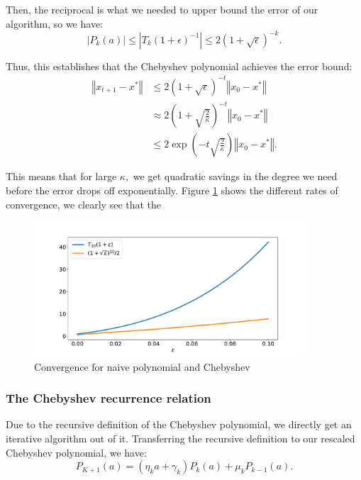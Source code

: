 Then, the reciprocal is what we needed to upper bound the error of our algorithm, so we have:
\begin{equation*}
|P_k(a)| \leq {|T_k(1 + \epsilon)^{-1}|} \leq 2(1 + \sqrt{\epsilon})^{-k}.
\end{equation*}

Thus, this establishes that the Chebyshev polynomial achieves the error bound:
\begin{align*}
\left\Vert x_{t+1} - x^* \right\Vert &\leq 2(1 + \sqrt{\epsilon})^{-t}
\left\Vert x_0 -x^*\right\Vert \\
&\approx 2\left(1 + \sqrt{\frac{2}{\kappa}}\right)^{-t} \left\Vert x_0 -x^*\right\Vert \\
&\leq 2\exp\left(-t \sqrt{\frac{2}{\kappa}}\right) \left\Vert x_0 -x^*\right\Vert.
\end{align*}

This means that for large $\kappa,$ we get quadratic savings in the degree we need before the error drops off exponentially. Figure \ref{convergence} shows the different rates of convergence, we clearly see that the 

\begin{figure}[ht]
\includegraphics[width=0.9\textwidth]{figures/lecture6-conv.pdf}
\centering
\caption{Convergence for naive polynomial and Chebyshev}
\label{convergence}
\end{figure}

\subsubsection{The Chebyshev recurrence relation}
Due to the recursive definition of the Chebyshev polynomial, we directly get an iterative algorithm out of it. Transferring the recursive definition to our rescaled Chebyshev polynomial, we have:
\begin{equation*}
P_{K+1}(a) = (\eta_k a + \gamma_k)P_k(a) + \mu_k P_{k-1}(a).
\end{equation*}

